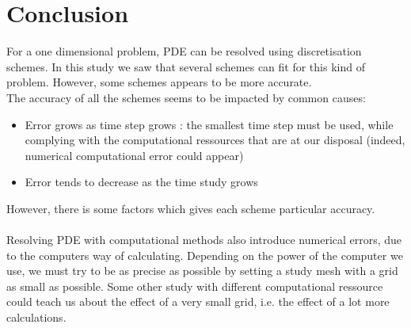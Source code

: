 \documentclass{article}
\begin{document}
        \section{Conclusion}
            For a one dimensional problem, PDE can be resolved using discretisation schemes. In this study
            we saw that several schemes can fit for this kind of problem. However, some schemes appears to
            be more accurate.\\
            The accuracy of all the schemes seems to be impacted by common causes:
            \begin{itemize}
                \item{Error grows as time step grows : the smallest time step must be used, while complying with
                the computational ressources that are at our disposal (indeed, numerical computational error could appear)}
                \item{Error tends to decrease as the time study grows}
            \end{itemize}
            
            However, there is some factors which gives each scheme particular accuracy.\\
            \\
            Resolving PDE with computational methods also introduce numerical errors, due to the computers way
            of calculating. Depending on the power of the computer we use, we must try to be as precise as possible
            by setting a study mesh with a grid as small as possible. Some other study with different computational ressource
            could teach us about the effect of a very small grid, i.e. the effect of a lot more calculations.
            
    
        \newpage
\end{document}
